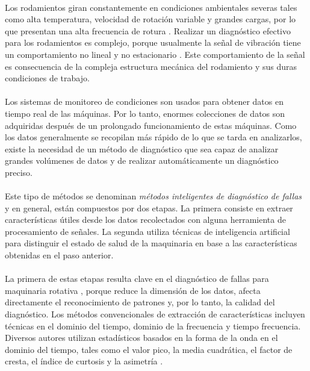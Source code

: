 \documentclass[12pt]{article}
\begin{document}
\paragraph{}
Los rodamientos giran constantemente en condiciones ambientales severas tales como alta temperatura, velocidad de rotación variable y grandes cargas, por lo que presentan una alta frecuencia de rotura \cite{fu}. Realizar un diagnóstico efectivo para los rodamientos es complejo, porque usualmente la señal de vibración tiene un comportamiento no lineal y no estacionario \cite{li}. Este comportamiento de la señal es consecuencia de la compleja estructura mecánica del rodamiento y sus duras condiciones de trabajo.

\paragraph{}
Los sistemas de monitoreo de condiciones son usados para obtener datos en tiempo real de las máquinas. Por lo tanto, enormes colecciones de datos son adquiridas después de un prolongado funcionamiento de estas máquinas. Como los datos generalmente se recopilan más rápido de lo que se tarda en analizarlos, existe la necesidad de un método de diagnóstico que sea capaz de analizar grandes volúmenes de datos y de realizar automáticamente un diagnóstico preciso.

\paragraph{}
Este tipo de métodos se denominan \textit{métodos inteligentes de diagnóstico de fallas} y en general, están compuestos por dos etapas. La primera consiste en extraer características útiles desde los datos recolectados con alguna herramienta de procesamiento de señales. La segunda utiliza técnicas de inteligencia artificial para distinguir el estado de salud de la maquinaria en base a las características obtenidas en el paso anterior.

\paragraph{}
La primera de estas etapas resulta clave en el diagnóstico de fallas para maquinaria rotativa \cite{guo}, porque reduce la dimensión de los datos, afecta directamente el reconocimiento de patrones y, por lo tanto, la calidad del diagnóstico. Los métodos convencionales de extracción de características incluyen técnicas en el dominio del tiempo, dominio de la frecuencia y tiempo frecuencia. Diversos autores utilizan estadísticos basados en la forma de la onda en el dominio del tiempo, tales como el valor pico, la media cuadrática, el factor de cresta, el índice de curtosis y la asimetría \cite{zhu}.
 
\end{document}
